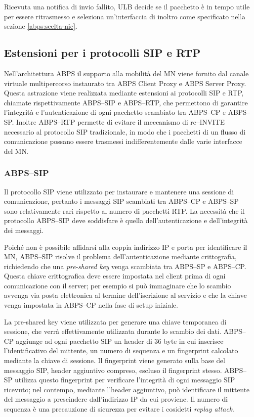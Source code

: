\documentclass[12pt,a4paper,openright,twoside]{book}
\begin{document}
Ricevuta una notifica di invio fallito, ULB decide se il pacchetto è
in tempo utile per essere ritrasmesso e seleziona un'interfaccia di
inoltro come specificato nella sezione \ref{abps:scelta-nic}.

\subsection{Estensioni per i protocolli SIP e RTP}

Nell'architettura ABPS il supporto alla mobilità del MN viene fornito
dal canale virtuale multipercorso instaurato tra ABPS Client Proxy e
ABPS Server Proxy. Questa astrazione viene realizzata mediante
estensioni ai protocolli SIP e RTP, chiamate rispettivamente ABPS--SIP
e ABPS--RTP, che permettono di garantire l'integrità e
l'autenticazione di ogni pacchetto scambiato tra ABPS--CP e
ABPS--SP. Inoltre ABPS--RTP permette di evitare il meccanismo di
re--INVITE necessario al protocollo SIP tradizionale, in modo che i
pacchetti di un flusso di comunicazione possano essere trasmessi
indifferentemente dalle varie interfacce del MN.

\subsubsection{ABPS--SIP}

Il protocollo SIP viene utilizzato per instaurare e mantenere una
sessione di comunicazione, pertanto i messaggi SIP scambiati tra
ABPS--CP e ABPS--SP sono relativamente rari rispetto al numero di
pacchetti RTP. La necessità che il protocollo ABPS--SIP deve
soddisfare è quella dell'autenticazione e dell'integrità dei
messaggi.

Poiché non è possibile affidarsi alla coppia indirizzo IP e porta per
identificare il MN, ABPS--SIP risolve il problema dell'autenticazione
mediante crittografia, richiedendo che una \emph{pre-shared key} venga
scambiata tra ABPS--SP e ABPS--CP. Questa chiave crittografica deve
essere impostata nel client prima di ogni comunicazione con il server;
per esempio si può immaginare che lo scambio avvenga via posta
elettronica al termine dell'iscrizione al servizio e che la chiave
venga impostata in ABPS--CP nella fase di setup iniziale.

La pre-shared key viene utilizzata per generare una chiave temporanea
di sessione, che verrà effettivamente utilizzata durante lo scambio
dei dati. ABPS--CP aggiunge ad ogni pacchetto SIP un header di 36 byte
in cui inserisce l'identificativo del mittente, un numero di sequenza
e un fingerprint calcolato mediante la chiave di sessione. Il
fingerprint viene generato sulla base del messaggio SIP, header
aggiuntivo compreso, escluso il fingerprint stesso. ABPS--SP utilizza
questo fingerprint per verificare l'integrità di ogni messaggio SIP
ricevuto; nel contempo, mediante l'header aggiuntivo, può identificare
il mittente del messaggio a prescindere dall'indirizzo IP da cui
proviene. Il numero di sequenza è una precauzione di sicurezza per
evitare i cosidetti \emph{replay attack}.
\end{document}
